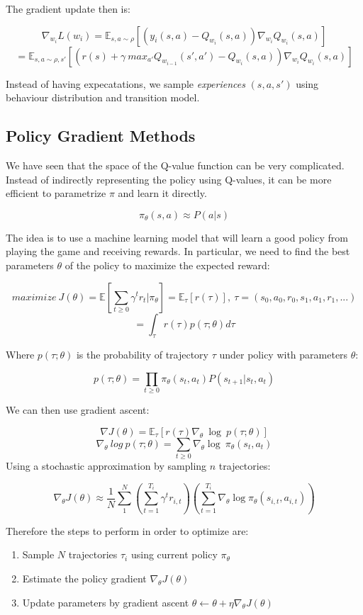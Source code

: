 \documentclass{article}
\begin{document}
The gradient update then is:

\[\nabla_{w_i}L(w_i)=\mathbb{E}_{s, a\sim \rho }[(y_i(s, a)-Q_{w_i}(s, a))\nabla_{w_i}Q_{w_i}(s, a)]\]
\[= \mathbb{E}_{s, a\sim \rho, s'}[(r(s)+\gamma\ max_{a'}Q_{w_{i-1}}(s', a')-Q_{w_i}(s,a))\nabla_{w_i}Q_{w_i}(s, a)]\]

Instead of having expecatations, we sample \emph{experiences}
\((s, a, s')\) using behaviour distribution and transition model.

\subsection{Policy Gradient Methods}\label{policy-gradient-methods}

We have seen that the space of the Q-value function can be very
complicated. Instead of indirectly representing the policy using
Q-values, it can be more efficient to parametrize \(\pi\) and learn it
directly.

\[\pi_{\theta}(s, a)\approx P(a|s)\]

The idea is to use a machine learning model that will learn a good
policy from playing the game and receiving rewards. In particular, we
need to find the best parameters \(\theta\) of the policy to maximize
the expected reward:

\[maximize\ J(\theta)=\mathbb{E}[\sum_{t\ge 0}\gamma^tr_t|\pi_{\theta}]=\mathbb{E}_\tau[r(\tau)],\ \tau=(s_0, a_0, r_0, s_1, a_1, r_1, ...)\]
\[=\int_{\tau}r(\tau)p(\tau; \theta)d\tau\]

Where \(p(\tau; \theta)\) is the probability of trajectory \(\tau\)
under policy with parameters \(\theta\):

\[p(\tau; \theta)=\prod_{t\ge 0}\pi_{\theta}(s_t, a_t)P(s_{t+1}|s_t, a_t)\]

We can then use gradient ascent:

\[\nabla J(\theta)=\mathbb{E}_{\tau}[r(\tau)\nabla_{\theta}\ \log\ p(\tau; \theta)]\]
\[\nabla_\theta\ log\ p(\tau; \theta)=\sum_{t\ge0}\nabla_{\theta}\log\ \pi_{\theta}(s_t, a_t)\]
Using a stochastic approximation by sampling \(n\) trajectories:

\[\nabla_{\theta}J(\theta)\approx\frac{1}{N}\sum_{1}^{N}(\sum_{t=1}^{T_i}\gamma^tr_{i, t})(\sum_{t=1}^{T_i}\nabla_{\theta} \log \pi_{\theta}(s_{i, t}, a_{i, t}))\]

Therefore the steps to perform in order to optimize are:

\begin{enumerate}
\def\labelenumi{\arabic{enumi}.}
\tightlist
\item
  Sample \(N\) trajectories \(\tau_i\) using current policy
  \(\pi_{\theta}\)
\item
  Estimate the policy gradient \(\nabla_{\theta}J(\theta)\)
\item
  Update parameters by gradient ascent
  \(\theta \leftarrow \theta + \eta \nabla_{\theta}J(\theta)\)
\end{enumerate}
\end{document}
